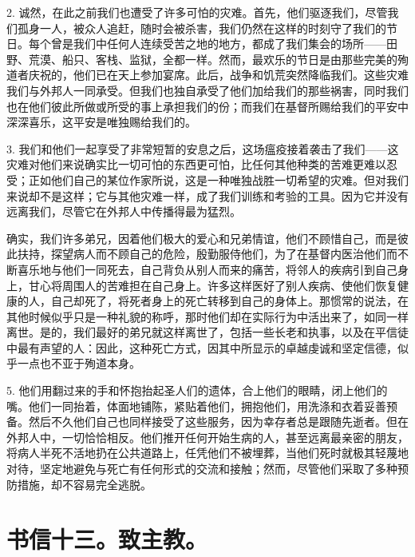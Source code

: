 2. 诚然，在此之前我们也遭受了许多可怕的灾难。首先，他们驱逐我们，尽管我们孤身一人，被众人追赶，随时会被杀害，我们仍然在这样的时刻守了我们的节日。每个曾是我们中任何人连续受苦之地的地方，都成了我们集会的场所——田野、荒漠、船只、客栈、监狱，全都一样。然而，最欢乐的节日是由那些完美的殉道者庆祝的，他们已在天上参加宴席。此后，战争和饥荒突然降临我们。这些灾难我们与外邦人一同承受。但我们也独自承受了他们加给我们的那些祸害，同时我们也在他们彼此所做或所受的事上承担我们的份；而我们在基督所赐给我们的平安中深深喜乐，这平安是唯独赐给我们的。\par

3. 我们和他们一起享受了非常短暂的安息之后，这场瘟疫接着袭击了我们——这灾难对他们来说确实比一切可怕的东西更可怕，比任何其他种类的苦难更难以忍受；正如他们自己的某位作家所说，这是一种唯独战胜一切希望的灾难。但对我们来说却不是这样；它与其他灾难一样，成了我们训练和考验的工具。因为它并没有远离我们，尽管它在外邦人中传播得最为猛烈。\par

确实，我们许多弟兄，因着他们极大的爱心和兄弟情谊，他们不顾惜自己，而是彼此扶持，探望病人而不顾自己的危险，殷勤服侍他们，为了在基督内医治他们而不断喜乐地与他们一同死去，自己背负从别人而来的痛苦，将邻人的疾病引到自己身上，甘心将周围人的苦难担在自己身上。许多这样医好了别人疾病、使他们恢复健康的人，自己却死了，将死者身上的死亡转移到自己的身体上。那惯常的说法，在其他时候似乎只是一种礼貌的称呼，那时他们却在实际行为中活出来了，如同一样离世。是的，我们最好的弟兄就这样离世了，包括一些长老和执事，以及在平信徒中最有声望的人：因此，这种死亡方式，因其中所显示的卓越虔诚和坚定信德，似乎一点也不亚于殉道本身。\par

5. 他们用翻过来的手和怀抱抬起圣人们的遗体，合上他们的眼睛，闭上他们的嘴。他们一同抬着，体面地铺陈，紧贴着他们，拥抱他们，用洗涤和衣着妥善预备。然后不久他们自己也同样接受了这些服务，因为幸存者总是跟随先逝者。但在外邦人中，一切恰恰相反。他们推开任何开始生病的人，甚至远离最亲密的朋友，将病人半死不活地扔在公共道路上，任凭他们不被埋葬，当他们死时就极其轻蔑地对待，坚定地避免与死亡有任何形式的交流和接触；然而，尽管他们采取了多种预防措施，却不容易完全逃脱。\par


\section{书信十三。致主教。}

